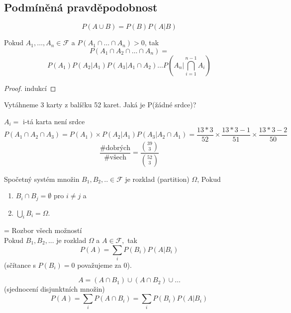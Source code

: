 \documentclass[../main.tex]{subfiles}
\begin{document}
\subsection{Podmíněná pravděpodobnost}
\begin{definition}
    \[P(A\cup B) = P(B)P(A|B)\]
\end{definition}

\begin{theorem}
    Pokud $A_1,\dots,A_n \in \mathcal{F}$ a $P(A_1\cap \dots \cap A_n) > 0$, tak
    \[P(A_1\cap A_2 \cap \dots \cap A_n) = \]
    \[P(A_1)P(A_2|A_1)P(A_3|A_1\cap A_2) \dots P(A_n | \bigcap^{n-1}_{i=1} A_i)\]
\end{theorem}
\begin{proof}
    indukcí %
\end{proof}


\begin{example}
    Vytáhneme 3 karty z balíčku 52 karet. Jaká je P(žádné srdce)?

    $A_i =$ i-tá karta není srdce
    \[P(A_1\cap A_2 \cap A_3) = P(A_1) \times P(A_2 | A_1) P(A_3 | A_2\cap A_1) = \frac{13*3}{52} \times \frac{13*3 -1}{51} \times \frac{13*3 - 2}{50}\]
    \[\frac{\text{\#dobrých}}{\text{\#všech}} = \frac{\binom{39}{3}}{\binom{52}{3}}\]
\end{example}

\begin{definition}
    Spočetný systém množin $B_1,B_2,..\in \mathcal{F}$ je rozklad (partition) $\Omega$, Pokud
    \begin{enumerate}
        \item $B_i \cap B_j = \emptyset$ pro $i \neq j$ a
        \item $\bigcup_i B_i = \Omega$.
    \end{enumerate}
\end{definition}

\begin{theorem}
    = Rozbor všech možností
    \\ Pokud $B_1,B_2,...$ je rozklad $\Omega$ a $A \in \mathcal{F},$ tak
    \[P(A) = \sum_i P(B_i)P(A|B_i)\]
    (sčítance s $P(B_i) = 0$ považujeme za $0$).

    \[A = (A\cap B_1) \cup (A\cap B_2) \cup \dots\]
    (sjednocení disjunktních množin)
    \[P(A) = \sum_i P(A\cap B_i) = \sum_i P(B_i)P(A|B_i)\]
\end{theorem}
\end{document}
